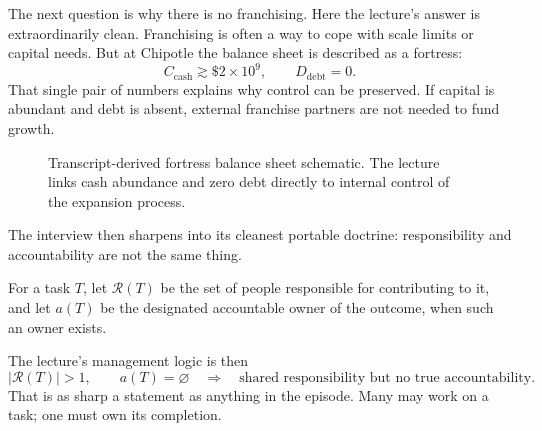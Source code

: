 The next question is why there is no franchising. Here the lecture's answer is extraordinarily clean. Franchising is often a way to cope with scale limits or capital needs. But at Chipotle the balance sheet is described as a fortress:
\begin{equation}
C_{\mathrm{cash}}\gtrsim \$2\times 10^9, \qquad D_{\mathrm{debt}}=0.
\end{equation}
That single pair of numbers explains why control can be preserved. If capital is abundant and debt is absent, external franchise partners are not needed to fund growth.

\begin{figure}
\centering
{}
\caption{Transcript-derived fortress balance sheet schematic. The lecture links cash abundance and zero debt directly to internal control of the expansion process.}
\end{figure}

The interview then sharpens into its cleanest portable doctrine: responsibility and accountability are not the same thing.

\begin{definition}
For a task \(T\), let \(\mathcal R(T)\) be the set of people responsible for contributing to it, and let \(a(T)\) be the designated accountable owner of the outcome, when such an owner exists.
\end{definition}

The lecture's management logic is then
\begin{equation}
|\mathcal R(T)|>1,\qquad a(T)=\varnothing
\quad \Longrightarrow \quad
\text{shared responsibility but no true accountability.}
\end{equation}
That is as sharp a statement as anything in the episode. Many may work on a task; one must own its completion.

